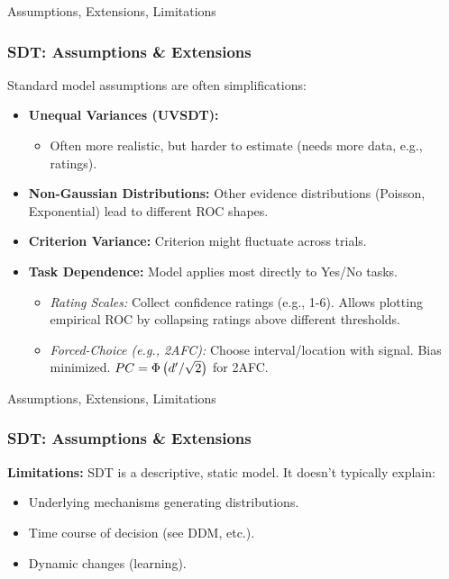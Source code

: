\documentclass[aspectratio=169]{beamer}
\begin{document}
\begin{frame}{Assumptions, Extensions, Limitations}
  \frametitle{SDT: Assumptions \& Extensions}
  Standard model assumptions are often simplifications:
  \begin{itemize}
    \item \textbf{Unequal Variances (UVSDT):}
    \begin{itemize}
        \item Often more realistic, but harder to estimate (needs more data, e.g., ratings).
    \end{itemize}
    \item \textbf{Non-Gaussian Distributions:} Other evidence distributions (Poisson, Exponential) lead to different ROC shapes.
    \item \textbf{Criterion Variance:} Criterion might fluctuate across trials.
    \item \textbf{Task Dependence:} Model applies most directly to Yes/No tasks.
    \begin{itemize}
        \item \emph{Rating Scales:} Collect confidence ratings (e.g., 1-6). Allows plotting empirical ROC by collapsing ratings above different thresholds.
        \item \emph{Forced-Choice (e.g., 2AFC):} Choose interval/location with signal. Bias minimized. $PC = \Phi\left(d'/\sqrt{2}\right)$ for 2AFC.
    \end{itemize}
  \end{itemize}
\end{frame}


\begin{frame}{Assumptions, Extensions, Limitations}
  \frametitle{SDT: Assumptions \& Extensions}
  \textbf{Limitations:} SDT is a descriptive, static model. It doesn't typically explain:
  \begin{itemize}
      \item Underlying mechanisms generating distributions.
      \item Time course of decision (see DDM, etc.).
      \item Dynamic changes (learning).
  \end{itemize}
\end{frame}
\end{document}
